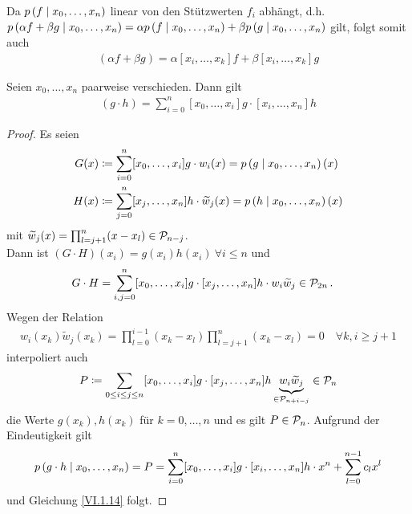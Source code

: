 \begin{Beme}
  Da $p\left( f \mid x_0,\dotsc,x_n \right)$ linear 
  von den Stützwerten $f_i$ abhängt,
  d.h. $p\left( \alpha f+\beta g \mid x_0,\dotsc,x_n \right) = 
  \alpha p\left( f \mid x_0,\dotsc,x_n \right)+\beta p\left( g \mid x_0,\dotsc,x_n \right)$
  gilt, folgt somit auch
  \begin{gather*}
    [x_i,\dotsc, x_k](\alpha f+\beta g)
    =  \alpha [x_i,\dotsc, x_k]f+\beta [x_i,\dotsc, x_k]g 
  \end{gather*}
\end{Beme}


\begin{Satze}\label{6.1.10}
  Seien $x_0,\dots, x_n$ paarweise verschieden. Dann gilt
  \begin{gather}
    [x_0,\dotsc, x_n] (g\cdot h) 
    = \sum_{i=0}^{n}[x_0,\dotsc,x_i]g\cdot [x_i,\dots,x_n]h
    \label{VI.1.14}
  \end{gather}
\end{Satze}

\begin{proof}
  Es seien
  \begin{align*}
    G(x) &\coloneqq \sum_{i=0}^{n} [x_0,\dotsc,x_i]g\cdot w_i(x)
           = p\left( g \mid x_0,\dotsc,x_n \right)(x)\\
    H(x) &\coloneqq \sum_{j=0}^{n}[x_j,\dotsc, x_n]h\cdot\widetilde{w}_j(x)
           =p\left( h \mid x_0,\dotsc,x_n \right)(x)
  \end{align*}
  mit $\widetilde{w}_j(x) =
  \prod_{l=j+1}^{n}(x-x_l)\in\mathcal{P}_{n-j}$.\\
  Dann ist $(G\cdot H)(x_i)=g(x_i)h(x_i)~\forall i\leq n$ und
  \begin{align*}
    G\cdot H &= \sum_{i,j=0}^{n}[x_0,\dotsc,x_i]g\cdot
               [x_j,\dotsc,x_n]h\cdot w_i\widetilde{w}_j
               \in\mathcal{P}_{2n} \,.
  \end{align*}
  Wegen der Relation
  \begin{gather*}
    w_i(x_k)\widetilde{w}_j(x_k) = \prod_{l=0}^{i-1}(x_k-x_l)
    \prod_{l=j+1}^{n}(x_k-x_l) = 0
    \quad \forall k, i\geq j+1
  \end{gather*}
  interpoliert auch 
  \begin{gather*}
    P\coloneqq \sum_{0\leq i\leq j\leq n}[x_0,\dotsc, x_i]g
    \cdot [x_j,\dotsc, x_n]h
    \underbrace{w_i\widetilde{w}_j}_{\in\mathcal{P}_{n+i-j}}
    \in\mathcal{P}_n
  \end{gather*}
  die Werte $g(x_k),h(x_k)$ für $k=0,\dotsc,n$
  und es gilt $P\in\mathcal{P}_n$.
  Aufgrund der Eindeutigkeit gilt
  \begin{gather*}
    p\left( g\cdot h \mid x_0,\dotsc,x_n \right) = P 
    = \sum_{i=0}^{n}[x_0,\dotsc, x_i]g\cdot [x_i,\dotsc,x_n]h\cdot x^n
    + \sum_{l=0}^{n-1}c_lx^l
  \end{gather*}
  und Gleichung \eqref{VI.1.14} folgt.
\end{proof}


